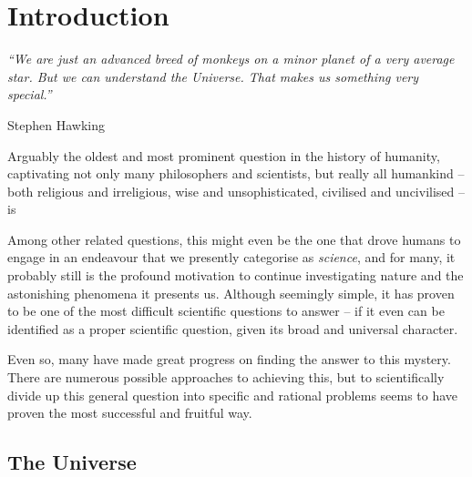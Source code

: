 
\chapter*{Introduction}
\label{ch:Introduction}

\renewcommand\thefigure{I.\arabic{figure}}
\setcounter{figure}{0}

\setlength{\epigraphwidth}{0.8\textwidth}
\epigraph{\textit{``We are just an advanced breed of monkeys on a minor planet of a very average star. But we can understand the Universe. That makes us something very special.''}}{Stephen Hawking}

Arguably the oldest and most prominent question in the history of humanity, captivating not only many philosophers and scientists, but really all humankind -- both religious and irreligious, wise and unsophisticated, civilised and uncivilised -- is

\renewcommand{\epigraphrule}{0pt}
\setlength{\epigraphwidth}{\textwidth}
\setlength{\beforeepigraphskip}{1 ex}
\setlength{\afterepigraphskip}{-2 ex}
\renewcommand{\epigraphsize}{\large}

\epigraph{}{}

\noindent Among other related questions, this might even be the one that drove humans to engage in an endeavour that we presently categorise as \textit{science}, and for many, it probably still is the profound motivation to continue investigating nature and the astonishing phenomena it presents us. Although seemingly simple, it has proven to be one of the most difficult scientific questions to answer -- if it even can be identified as a proper scientific question, given its broad and universal character.

\par Even so, many have made great progress on finding the answer to this mystery. There are numerous possible approaches to achieving this, but to scientifically divide up this general question into specific and rational problems seems to have proven the most successful and fruitful way.

\section*{The Universe}

